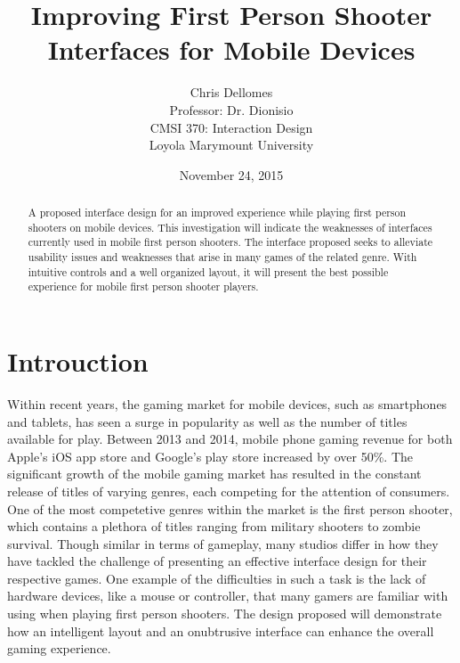 \documentclass{article}
\begin{document}
\title{Improving First Person Shooter Interfaces for Mobile Devices}
\author{Chris Dellomes\\
Professor: Dr. Dionisio\\
CMSI 370: Interaction Design\\
	Loyola Marymount University}

\date{November 24, 2015}

\maketitle

\begin{center}
\begin{abstract}
\noindent A proposed interface design for an improved experience while playing first person shooters on mobile devices. This investigation will indicate the weaknesses of interfaces currently used in mobile first person shooters. The interface proposed seeks to alleviate usability issues and weaknesses that arise in many games of the related genre. With intuitive controls and a well organized layout, it will present the best possible experience for mobile first person shooter players.
\end{abstract}
\end{center}

\thispagestyle{empty}

\clearpage

\setcounter{page}{1}

\section{Introuction} Within recent years, the gaming market for mobile devices, such as smartphones and tablets, has seen a surge in popularity as well as the number of titles available for play. Between 2013 and 2014, mobile phone gaming revenue for both Apple's iOS app store and Google's play store increased by over 50\%. The significant growth of the mobile gaming market has resulted in the constant release of titles of varying genres, each competing for the attention of consumers. One of the most competetive genres within the market is the first person shooter, which contains a plethora of titles ranging from military shooters to zombie survival. Though similar in terms of gameplay, many studios differ in how they have tackled the challenge of presenting an effective interface design for their respective games. One example of the difficulties in such a task is the lack of hardware devices, like a mouse or controller, that many gamers are familiar with using when playing first person shooters. The design proposed will demonstrate how an intelligent layout and an onubtrusive interface can enhance the overall gaming experience.
\end{document}
